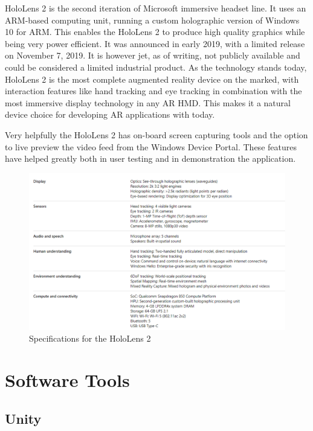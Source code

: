 HoloLens 2 is the second iteration of Microsoft immersive headset line. It uses an ARM-based computing unit, running a custom holographic version of Windows 10 for ARM. This enables the HoloLens 2 to produce high quality graphics while being very power efficient. It was announced in early 2019, with a limited release on November 7, 2019. It is however jet, as of writing, not publicly available and could be considered a limited industrial product.
As the technology stands today, HoloLens 2 is the most complete augmented reality device on the marked, with interaction features like hand tracking and eye tracking in combination with the most immersive display technology in any AR HMD. This makes it a natural device choice for developing AR applications with today. \author{fig:specshololens2}
Very helpfully the HoloLens 2 has on-board screen capturing tools and the option to live preview the video feed from the Windows Device Portal. These features have helped greatly both in user testing and in demonstration the application.

\begin{figure}[ht]
    \includegraphics[width=\textwidth]{fig/hololens2specs}
    \caption{Specifications for the HoloLens 2}
    \label{fig:specshololens2}
\end{figure}




\section{Software Tools}\label{chap:tools}


\subsection*{Unity}\label{chap:unity}

